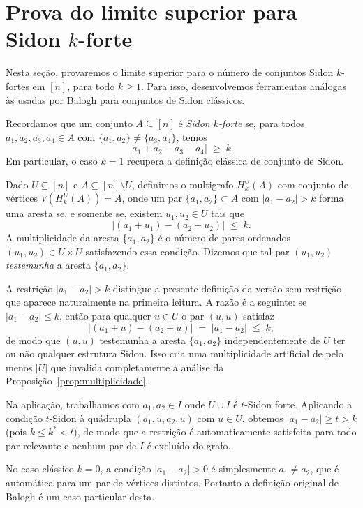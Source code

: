 \documentclass[reqno,a4paper,12pt]{amsart}
\begin{document}
\section{Prova do limite superior para Sidon \texorpdfstring{$k$}{k}-forte}

Nesta seção, provaremos o limite superior para o número de conjuntos Sidon $k$-fortes em $[n]$,
para todo $k \geq 1$. Para isso, desenvolvemos ferramentas análogas às usadas por Balogh para
conjuntos de Sidon clássicos.

Recordamos que um conjunto $A \subseteq [n]$ é \emph{Sidon $k$-forte} se, para todos
$a_1, a_2, a_3, a_4 \in A$ com $\{a_1, a_2\} \neq \{a_3, a_4\}$, temos
\[
  |a_1 + a_2 - a_3 - a_4| \;\geq\; k.
\]
Em particular, o caso $k = 1$ recupera a definição clássica de conjunto de Sidon.

\medskip
Dado $U \subseteq [n]$ e $A \subseteq [n] \setminus U$, definimos o multigrafo $H_k^U(A)$ com
conjunto de vértices $V(H_k^U(A)) = A$, onde um par $\{a_1, a_2\} \subset A$ com
$|a_1 - a_2| > k$ forma uma aresta se, e somente se, existem $u_1, u_2 \in U$ tais que
\[
  |(a_1 + u_1) - (a_2 + u_2)| \;\leq\; k.
\]
A multiplicidade da aresta $\{a_1,a_2\}$ é o número de pares ordenados $(u_1,u_2) \in U\times U$
satisfazendo essa condição. Dizemos que tal par $(u_1,u_2)$ \emph{testemunha} a aresta
$\{a_1,a_2\}$.

\begin{remark}
  A restrição $|a_1 - a_2| > k$ distingue a presente definição da versão sem restrição que
  aparece naturalmente na primeira leitura. A razão é a seguinte: se $|a_1 - a_2| \leq k$,
  então para qualquer $u \in U$ o par $(u, u)$ satisfaz
  \[
    |(a_1 + u) - (a_2 + u)| \;=\; |a_1 - a_2| \;\leq\; k,
  \]
  de modo que $(u,u)$ testemunha a aresta $\{a_1,a_2\}$ independentemente de $U$ ter ou não
  qualquer estrutura Sidon. Isso cria uma multiplicidade artificial de pelo menos $|U|$ que
  invalida completamente a análise da Proposição~\ref{prop:multiplicidade}.

  Na aplicação, trabalhamos com $a_1, a_2 \in I$ onde $U \cup I$ é $t$-Sidon forte. Aplicando
  a condição $t$-Sidon à quádrupla $(a_1, u, a_2, u)$ com $u \in U$, obtemos
  $|a_1 - a_2| \geq t > k$ (pois $k \leq k^* < t$), de modo que a restrição é automaticamente
  satisfeita para todo par relevante e nenhum par de $I$ é excluído do grafo.

  No caso clássico $k = 0$, a condição $|a_1 - a_2| > 0$ é simplesmente $a_1 \neq a_2$, que é
  automática para um par de vértices distintos. Portanto a definição original de Balogh é um
  caso particular desta.
\end{remark}
\end{document}
